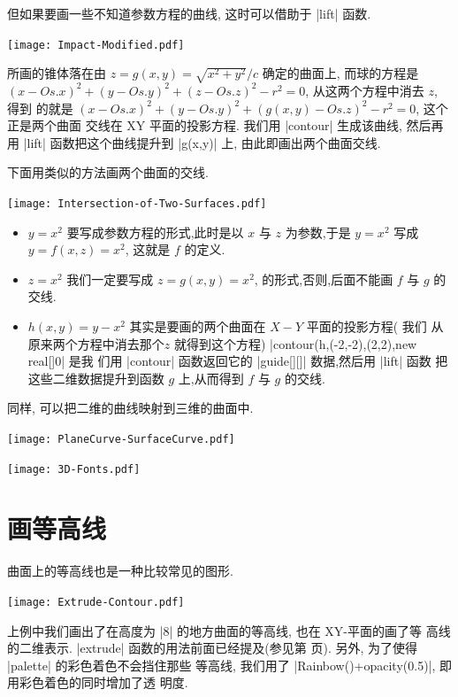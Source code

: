 \documentclass[nofonts,CJKnormalspaces]{ctexbook}[2009/05/20]
\begin{document}
但如果要画一些不知道参数方程的曲线, 这时可以借助于 |lift| 函数.
\begin{center}\texttt{[image: Impact-Modified.pdf]}\end{center}%

所画的锥体落在由 $z=g(x,y)=\sqrt{x^2+y^2}/c$ 确定的曲面上, 而球的方程是
$(x-Os.x)^2+(y-Os.y)^2+(z-Os.z)^2-r^2=0$, 从这两个方程中消去 $z$, 得到
的就是 $(x-Os.x)^2+(y-Os.y)^2+(g(x,y)-Os.z)^2-r^2=0$, 这个正是两个曲面
交线在 XY 平面的投影方程. 我们用 |contour| 生成该曲线, 然后再用 |lift|
函数把这个曲线提升到 |g(x,y)| 上, 由此即画出两个曲面交线.

下面用类似的方法画两个曲面的交线.
\begin{center}\texttt{[image: Intersection-of-Two-Surfaces.pdf]}\end{center}%

\begin{itemize}
\item $y=x^2$ 要写成参数方程的形式,此时是以 $x$ 与 $z$ 为参数,于是
  $y=x^2$ 写成  $y=f(x,z)=x^2$, 这就是 $f$ 的定义.
\item $z=x^2$ 我们一定要写成 $z=g(x,y)=x^2$, 的形式,否则,后面不能画 $f$ 与 $g$ 的交线.
\item $h(x,y)=y-x^2$ 其实是要画的两个曲面在 $X-Y$ 平面的投影方程( 我们
  从原来两个方程中消去那个$z$ 就得到这个方程)
  |contour(h,(-2,-2),(2,2),new real[]{0}|   是我
  们用  |contour| 函数返回它的 |guide[][]| 数据,然后用 |lift| 函数
  把这些二维数据提升到函数 $g$ 上,从而得到 $f$ 与 $g$ 的交线.
\end{itemize}
同样, 可以把二维的曲线映射到三维的曲面中.
\begin{center}\texttt{[image: PlaneCurve-SurfaceCurve.pdf]}\end{center}%

\begin{center}\texttt{[image: 3D-Fonts.pdf]}\end{center}%


\section{画等高线}
曲面上的等高线也是一种比较常见的图形.
\begin{center}\texttt{[image: Extrude-Contour.pdf]}\end{center}%

上例中我们画出了在高度为 |8| 的地方曲面的等高线, 也在 XY-平面的画了等
高线的二维表示. |extrude| 函数的用法前面已经提及(参见第
\pageref{extrude} 页). 另外, 为了使得 |palette| 的彩色着色不会挡住那些
等高线, 我们用了 |Rainbow()+opacity(0.5)|, 即用彩色着色的同时增加了透
明度.
\end{document}
